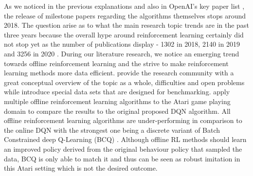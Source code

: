 \par
As we noticed in the previous explanations and also in OpenAI's key paper list \cite[]{keypaperlist}, the release of milestone papers regarding the algorithms themselves stops around 2018. The question arise as to what the main research topic trends are in the past three years because the overall hype around reinforcement learning certainly did not stop yet as the number of publications display - 1302 in 2018, 2140 in 2019 and 3256 in 2020 \cite[]{arxiv}. During our literature research, we notice an emerging trend towards offline reinforcement learning and the strive to make reinforcement learning methods more data efficient. \cite{levine2020offline} provide the research community with a great conceptual overview of the topic as a whole, difficulties and open problems while \cite{fu2021d4rl} introduce special data sets that are designed for benchmarking. \cite{fujimoto2019benchmarking} apply multiple offline reinforcement learning algorithms to the Atari game playing domain to compare the results to the original proposed DQN algorithm. All offline reinforcement learning algorithms are under-performing in comparison to the online DQN with the strongest one being a discrete variant of Batch Constrained deep Q-Learning (BCQ) \cite[pp.~7-9]{fujimoto2019benchmarking}. Although offline RL methods should learn an improved policy derived from the original behaviour policy that sampled the data, BCQ is only able to match it and thus can be seen as robust imitation in this Atari setting \cite[pp.~7]{fujimoto2019benchmarking} which is not the desired outcome.
\par
